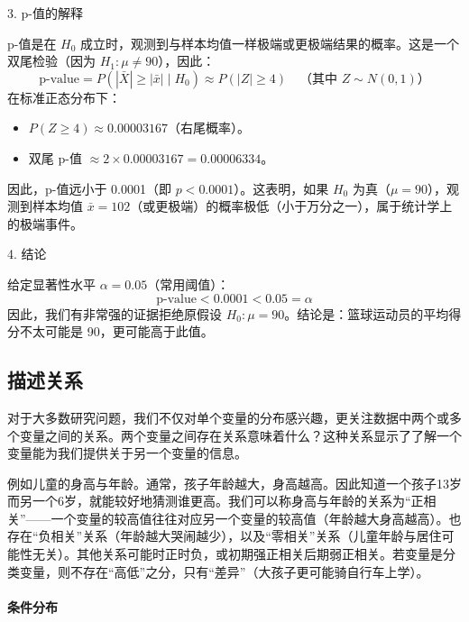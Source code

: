 \begin{example}
\begin{flushleft}	
3. p-值的解释
\end{flushleft}
p-值是在 \(H_0\) 成立时，观测到与样本均值一样极端或更极端结果的概率。这是一个双尾检验（因为 \(H_1: \mu \neq 90\)），因此：
\begin{equation}
\text{p-value} = P(|\bar{X}| \geq |\bar{x}| \mid H_0) \approx P(|Z| \geq 4) \quad \text{（其中 } Z \sim N(0,1)\text{）}
\end{equation}
在标准正态分布下：
\begin{itemize}
	\item \(P(Z \geq 4) \approx 0.00003167\)（右尾概率）。
	\item 双尾 p-值 \(\approx 2 \times 0.00003167 = 0.00006334\)。
\end{itemize}
因此，p-值远小于 0.0001（即 \(p < 0.0001\)）。这表明，如果 \(H_0\) 为真（\(\mu = 90\)），观测到样本均值 \(\bar{x} = 102\)（或更极端）的概率极低（小于万分之一），属于统计学上的极端事件。

\begin{flushleft}
4. 结论
\end{flushleft}
给定显著性水平 \(\alpha = 0.05\)（常用阈值）：
\begin{equation}
\text{p-value} < 0.0001 < 0.05 = \alpha
\end{equation}
因此，我们有非常强的证据拒绝原假设 \(H_0: \mu = 90\)。结论是：篮球运动员的平均得分不太可能是 90，更可能高于此值。

\end{example}

\subsection{描述关系}

对于大多数研究问题，我们不仅对单个变量的分布感兴趣，更关注数据中两个或多个变量之间的关系。两个变量之间存在关系意味着什么？这种关系显示了了解一个变量能为我们提供关于另一个变量的信息。

例如儿童的身高与年龄。通常，孩子年龄越大，身高越高。因此知道一个孩子13岁而另一个6岁，就能较好地猜测谁更高。我们可以称身高与年龄的关系为``正相关''——一个变量的较高值往往对应另一个变量的较高值（年龄越大身高越高）。也存在``负相关''关系（年龄越大哭闹越少），以及``零相关''关系（儿童年龄与居住可能性无关）。其他关系可能时正时负，或初期强正相关后期弱正相关。若变量是分类变量，则不存在``高低''之分，只有``差异''（大孩子更可能骑自行车上学）。

\paragraph*{条件分布}


